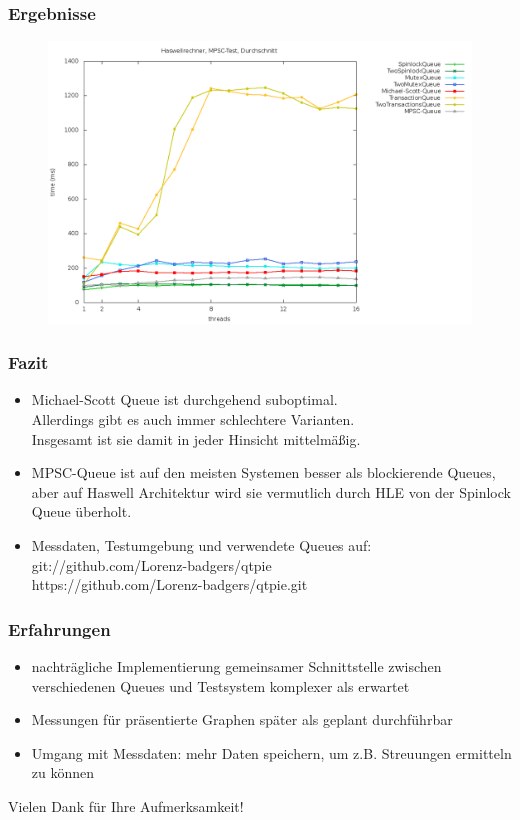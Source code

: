 \documentclass[svgnames]{beamer}
\begin{document}
\begin{frame}
\frametitle{Ergebnisse}
\begin {figure}
      \begin{center}
	\includegraphics[width=\textwidth]{fastboxsa.png}
     \end{center}
\end {figure}
\end{frame}



\begin{frame}
\frametitle{Fazit}
\begin{itemize}
\item Michael-Scott Queue ist durchgehend suboptimal.\\
	Allerdings gibt es auch immer schlechtere Varianten.\\
	Insgesamt ist sie damit in jeder Hinsicht mittelm\"a\ss{}ig.
\item MPSC-Queue ist auf den meisten Systemen besser als blockierende Queues,
	aber auf Haswell Architektur wird sie vermutlich durch HLE von der Spinlock Queue \"uberholt.
\item Messdaten, Testumgebung und verwendete Queues auf:\\
	git://github.com/Lorenz-badgers/qtpie \\
	https://github.com/Lorenz-badgers/qtpie.git
\end{itemize}
\end{frame}


\begin{frame}
\frametitle{Erfahrungen}
\begin{itemize}
\item nachtr\"agliche Implementierung gemeinsamer Schnittstelle zwischen verschiedenen Queues und Testsystem komplexer als erwartet
\item Messungen f\"ur pr\"asentierte Graphen sp\"ater als geplant durchf\"uhrbar
\item Umgang mit Messdaten: mehr Daten speichern, um z.B. Streuungen ermitteln zu k\"onnen
\end{itemize}
\end{frame}



\begin{frame}
\Large{\centerline{Vielen Dank f\"ur Ihre Aufmerksamkeit!}}
\end{frame}
\end{document}
